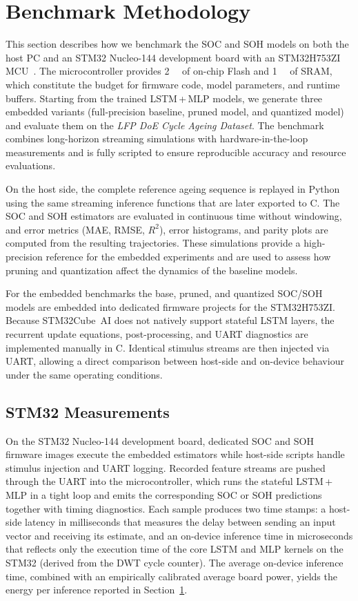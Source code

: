 \documentclass[final,3p,times]{elsarticle}
\begin{document}
\section{Benchmark Methodology}\label{sec:kpis}
This section describes how we benchmark the SOC and SOH models on both the host PC and an STM32 Nucleo-144 development board with an STM32H753ZI MCU~\cite{STM32Nucleo144Boards2025_Datasheet,naguibMicroprocessorExecutionTime2022}. The microcontroller provides \SI{2}{\mega\byte} of on-chip Flash and \SI{1}{\mega\byte} of SRAM, which constitute the budget for firmware code, model parameters, and runtime buffers. Starting from the trained LSTM\,+\,MLP models, we generate three embedded variants (full-precision baseline, pruned model, and quantized model) and evaluate them on the \emph{LFP DoE Cycle Ageing Dataset}. The benchmark combines long-horizon streaming simulations with hardware-in-the-loop measurements and is fully scripted to ensure reproducible accuracy and resource evaluations.

On the host side, the complete reference ageing sequence is replayed in Python using the same streaming inference functions that are later exported to C. The SOC and SOH estimators are evaluated in continuous time without windowing, and error metrics (MAE, RMSE, $R^2$), error histograms, and parity plots are computed from the resulting trajectories. These simulations provide a high-precision reference for the embedded experiments and are used to assess how pruning and quantization affect the dynamics of the baseline models.

For the embedded benchmarks the base, pruned, and quantized SOC/SOH models are embedded into dedicated firmware projects for the STM32H753ZI. Because STM32Cube~AI does not natively support stateful LSTM layers, the recurrent update equations, post-processing, and UART diagnostics are implemented manually in C. Identical stimulus streams are then injected via UART, allowing a direct comparison between host-side and on-device behaviour under the same operating conditions.

\subsection{STM32 Measurements}
On the STM32 Nucleo-144 development board, dedicated SOC and SOH firmware images execute the embedded estimators while host-side scripts handle stimulus injection and UART logging. Recorded feature streams are pushed through the UART into the microcontroller, which runs the stateful LSTM\,+\,MLP in a tight loop and emits the corresponding SOC or SOH predictions together with timing diagnostics. Each sample produces two time stamps: a host-side latency in milliseconds that measures the delay between sending an input vector and receiving its estimate, and an on-device inference time in microseconds that reflects only the execution time of the core LSTM and MLP kernels on the STM32 (derived from the DWT cycle counter). The average on-device inference time, combined with an empirically calibrated average board power, yields the energy per inference reported in Section~\ref{sec:kpis}.
\end{document}
